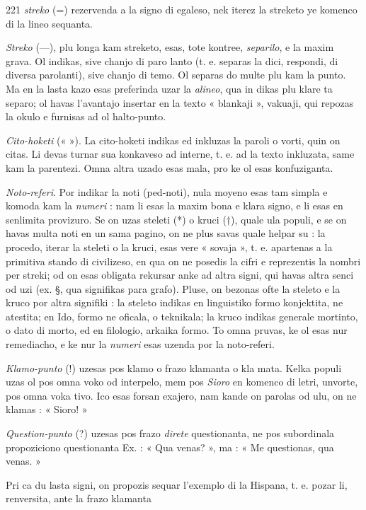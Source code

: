 \begin{VUpage}[225]{221}
\VUcontinue
\textit{streko} (=) rezervenda a la signo di egaleso, nek iterez la\nl
streketo ye komenco di la lineo sequanta.

\textit{Streko} (---), plu longa kam streketo, esas, tote kontree,\nl
\textit{separilo}, e la maxim grava. Ol indikas, sive chanjo di paro\cc
lanto (t. e. separas la dici, respondi, di diversa parolanti),\nl
sive chanjo di temo. Ol separas do multe plu kam la punto.\nl
Ma en la lasta kazo esas preferinda uzar la \textit{alineo}, qua in\cc
dikas plu klare ta separo; ol havas l'avantajo insertar en la\nl
texto « blankaji », vakuaji, qui repozas la okulo e furnisas\nl
ad ol halto-punto.

\textit{Cito-hoketi} (« »). La cito-hoketi indikas ed inkluzas la\nl
paroli o vorti, quin on citas. Li devas turnar sua konkaveso\nl
ad interne, t. e. ad la texto inkluzata, same kam la parentezi.\nl
Omna altra uzado esas mala, pro ke ol esas konfuziganta.\parplein

\textit{Noto-referi}. Por indikar la noti (ped-noti), nula moyeno\nl
esas tam simpla e komoda kam la \textit{numeri} : nam li esas la\nl
maxim bona e klara signo, e li esas en senlimita provizuro.\nl
Se on uzas steleti (*) o kruci (†), quale ula populi, e se on\nl
havas multa noti en un sama pagino, on ne plus savas quale\nl
helpar su : la procedo, iterar la steleti o la kruci, esas vere\nl
« sovaja », t. e. apartenas a la primitiva stando di civilizeso,\nl
en qua on ne posedis la cifri e reprezentis la nombri per\nl
streki; od on esas obligata rekursar anke ad altra signi,\nl
qui havas altra senci od uzi (ex. §, qua signifikas para\cc
grafo). Pluse, on bezonas ofte la steleto e la kruco por altra\nl
signifiki : la steleto indikas en linguistiko formo konjektita,\nl
ne atestita; en Ido, formo ne oficala, o teknikala; la kruco\nl
indikas generale mortinto, o dato di morto, ed en filologio,\nl
arkaika formo. To omna pruvas, ke ol esas nur remediacho,\nl
e ke nur la \textit{numeri} esas uzenda por la noto-referi.

\textit{Klamo-punto} (!) uzesas pos klamo o frazo klamanta o kla\cc
mata. Kelka populi uzas ol pos omna voko od interpelo,\nl
mem pos \textit{Sioro} en komenco di letri, unvorte, pos omna voka\cc
tivo. Ico esas forsan exajero, nam kande on parolas od ulu,\nl
on ne klamas : « Sioro! »

\textit{Question-punto} (?) uzesas pos frazo \textit{direte} questionanta,\nl
ne pos subordinala propoziciono questionanta Ex. : « Qua\nl
venas? », ma : « Me questionas, qua venas. »

Pri ca du lasta signi, on propozis sequar l'exemplo di la\nl
Hispana, t. e. pozar li, renversita, ante la frazo klamanta\nl
\end{VUpage}

